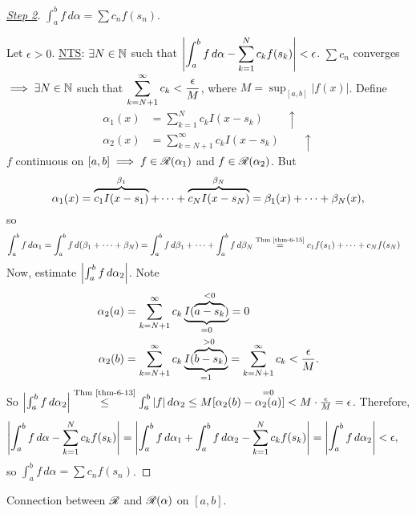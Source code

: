 \documentclass[]{article}
\begin{document}
\begin{proof}
	[\ul{Step 2}] $\int_a^b f\,d\alpha = \sum c_nf(s_n)$.

	Let $\epsilon>0$. \ul{NTS}: $\exists N\in\mb N$ such that $\ds\mlr{\int_a^b f\,d\alpha - \sum_{k=1}^N c_kf(s_k)} < \epsilon$.
	$\sum c_n$ converges $\implies \exists N\in\mb N$ such that $\ds\sum_{k=N+1}^\infty c_k < \frac\epsilon M$, where $M = \sup_{[a,b]} |f(x)|$.
	Define
	\begin{align*}
		\alpha_1(x) &= \sum_{k=1}^N c_kI(x-s_k) \qquad \uparrow \\
		\alpha_2(x) &= \sum_{k=N+1}^\infty c_kI(x-s_k) \qquad \uparrow
	\end{align*}
	$f$ continuous on $[a,b] \implies f\in\ms R(\alpha_1)$ and $f\in\ms R(\alpha_2)$.
	But $$\alpha_1(x) = \ob{\beta_1}{c_1 I(x-s_1)} + \dots + \ob{\beta_N}{c_N I(x-s_N)} = \beta_1(x) + \dots + \beta_N(x),$$ so 
	\begin{align*}
		\int_a^b f\,d\alpha_1 = \int_a^b f\,d(\beta_1+\dots+\beta_N) 
		&= \int_a^b f\,d\beta_1 + \dots + \int_a^bf\,d\beta_N
		\os{\text{Thm \ref{thm-6-15}}}= c_1 f(s_1) + \dots + c_Nf(s_N)
	\end{align*}
	Now, estimate $\mlr{\int_a^bf\,d\alpha_2}$. Note 
	\begin{align*}
		\alpha_2(a) &= \sum_{k=N+1}^\infty c_k \ub{=0}{I(\ob{<0}{a-s_k})} = 0 \\
		\alpha_2(b) &= \sum_{k=N+1}^\infty c_k \ub{=1}{I(\ob{>0}{b-s_k})} = \sum_{k=N+1}^\infty c_k < \frac\epsilon M.
	\end{align*}
	So $\mlr{\int_a^b f\,d\alpha_2} \os{\text{Thm \ref{thm-6-13}}}\leq \int_a^b |f|\,d\alpha_2 \leq M [\alpha_2(b)-\os{=0}{\alpha_2(a)}] < M\cdot\frac\epsilon M = \epsilon$.
	Therefore,
	\begin{align*}
		\mlr{\int_a^b f\,d\alpha - \sum_{k=1}^N c_kf(s_k)}
		&= \mlr{\int_a^b f\,d\alpha_1 + \int_a^b f\,d\alpha_2 - \sum_{k=1}^N c_kf(s_k)}
		= \mlr{\int_a^b f\,d\alpha_2} < \epsilon,
	\end{align*}
	so $\int_a^b f\,d\alpha = \sum c_nf(s_n)$.
\end{proof}

Connection between $\ms R$ and $\ms R(\alpha)$ on $[a,b]$.
\end{document}
